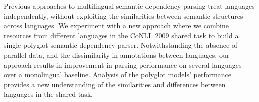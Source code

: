 Previous approaches to multilingual semantic dependency parsing treat languages independently, without exploiting the similarities between semantic structures across languages. We experiment with a new approach where we combine resources from different languages in the CoNLL 2009 shared task to build a single polyglot semantic dependency parser. Notwithstanding the absence of parallel data, and the dissimilarity in annotations between languages, our approach results in improvement in parsing performance on several languages over a monolingual baseline. Analysis of the polyglot models' performance provides a new understanding of the similarities and differences between languages in the shared task.
